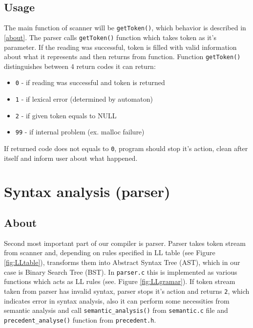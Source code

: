 \documentclass[11pt, titlepage]{article}
\begin{document}
\subsection{Usage}\label{usage}

The main function of scanner will be \texttt{getToken()}, which behavior
is described in \ref{about}. The parser calls \texttt{getToken()} function which takes
token as it's parameter. If the reading was
successful, token is filled with valid
information about what it represents and then returns from function.
Function \texttt{getToken()} distinguishes between 4 return codes it can
return: 
\begin{itemize}[itemsep=-5pt]
\item
	\texttt{0} - if reading was successful and token is returned
\item
	\texttt{1} - if lexical error (determined by automaton)
\item
	\texttt{2} - if given token equals to NULL
\item
	\texttt{99} - if internal problem (ex. malloc failure)
\end{itemize}

If returned code does not equals to \texttt{0}, program should stop it's
action, clean after itself and inform user about what happened.






\section{Syntax analysis (parser)}\label{syntax-analysis-parser}

\subsection{About}\label{about-1}

Second most important part of our compiler is parser. Parser takes
token stream from scanner and,
depending on rules specified in LL table (see Figure \ref{fig:LLtable}), transforms
them into Abstract Syntax Tree (AST), which in our case is Binary
Search Tree (BST). In \texttt{parser.c} this is implemented as various
functions which acts as LL rules (see. Figure \ref{fig:LLgramar}). If token stream
taken from parser has invalid syntax, parser stops it's action and
returns \texttt{2}, which indicates error in syntax analysis, also
it can perform some necessities from semantic analysis and call \texttt{semantic\_analysis()} from \texttt{semantic.c} file and 
\texttt{precedent\_analyse()} function from \texttt{precedent.h}.
\end{document}
